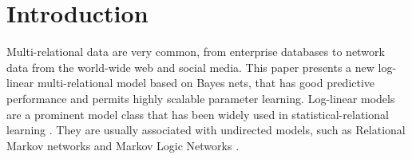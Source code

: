 \documentclass{article}
\begin{document}
 
 
\section{Introduction}
Multi-relational data are very common, from enterprise  databases to network data from the world-wide web and social media. This paper presents a new log-linear multi-relational model based on Bayes nets, that has good predictive performance and permits highly scalable parameter learning. Log-linear models are a prominent model class that has been widely used in statistical-relational learning \cite{Sutton2007}. They are usually associated with undirected models, such as Relational Markov networks \cite{Taskar2002} and Markov Logic Networks \cite{Domingos2009}.    
\end{document}

